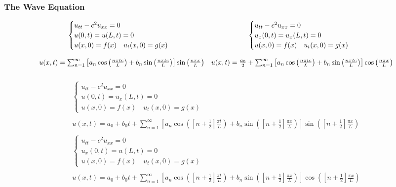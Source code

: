 \documentclass{article}
\begin{document}
\subsubsection*{The Wave Equation}
\[
\begin{array}{c c}
\begin{cases}
u_{tt} - c^{2}u_{xx} = 0\\
u(0,t) = u(L,t) = 0\\
u(x,0) = f(x) \quad u_{t}(x,0) = g(x)
\end{cases}
&
\begin{cases}
u_{tt} - c^{2}u_{xx} = 0\\
u_{x}(0,t) = u_{x}(L,t) = 0\\
u(x,0) = f(x) \quad u_{t}(x,0) = g(x)
\end{cases}\\
&\\
u(x,t) = \sum_{n=1}^{\infty}\left[a_{n}\cos{\left(\frac{n \pi t c}{L}\right)} + b_{n}\sin{\left(\frac{n \pi t c}{L}\right)}\right]\sin{\left(\frac{n \pi x}{L}\right)}
&u(x,t) = \frac{a_{0}}{2} + \sum_{n=1}^{\infty}\left[a_{n}\cos{\left(\frac{n \pi t c}{L}\right)} + b_{n}\sin{\left(\frac{n \pi t c}{L}\right)}\right]\cos{\left(\frac{n \pi x}{L}\right)}\\
&\\
\end{array}
\]
\[
\begin{array}{c}
\begin{cases}
u_{tt} - c^{2}u_{xx} = 0\\
u(0,t) = u_{x}(L,t) = 0\\
u(x,0) = f(x) \quad u_{t}(x,0) = g(x)
\end{cases}\\
\\
u(x,t) = a_{0} + b_{0}t + \sum_{n=1}^{\infty}\left[ a_{n}\cos{\left(\left[n + \frac{1}{2}\right]\frac{\pi t}{L}\right)} + b_{n}\sin{\left(\left[n + \frac{1}{2}\right]\frac{\pi x}{L}\right)}\right]\sin{\left(\left[n + \frac{1}{2}\right]\frac{\pi x}{L}\right)}\\
\\
\begin{cases}
u_{tt} - c^{2}u_{xx} = 0\\
u_{x}(0,t) = u(L,t) = 0\\
u(x,0) = f(x) \quad u_{t}(x,0) = g(x)
\end{cases}\\
\\
u (x,t) = a_{0} + b_{0}t + \sum_{n=1}^{\infty}\left[ a_{n}\cos{\left(\left[n + \frac{1}{2}\right]\frac{\pi t}{L}\right)} + b_{n}\sin{\left(\left[n + \frac{1}{2}\right]\frac{\pi x}{L}\right)}\right]\cos{\left(\left[n + \frac{1}{2}\right]\frac{\pi x}{L}\right)}
\end{array}
\]
\end{document}

